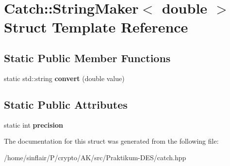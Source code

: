 \hypertarget{structCatch_1_1StringMaker_3_01double_01_4}{}\section{Catch\+:\+:String\+Maker$<$ double $>$ Struct Template Reference}
\label{structCatch_1_1StringMaker_3_01double_01_4}
\subsection*{Static Public Member Functions}
\begin{DoxyCompactItemize}
\item 
\mbox{\label{structCatch_1_1StringMaker_3_01double_01_4_acaa61529acad2462292c747d34e5f3d2}} 
static std\+::string {\bfseries convert} (double value)
\end{DoxyCompactItemize}
\subsection*{Static Public Attributes}
\begin{DoxyCompactItemize}
\item 
\mbox{\label{structCatch_1_1StringMaker_3_01double_01_4_a15fa2b093c532ece7f1d0c713ebaee67}} 
static int {\bfseries precision}
\end{DoxyCompactItemize}


The documentation for this struct was generated from the following file\+:\begin{DoxyCompactItemize}
\item 
/home/sinflair/\+P/crypto/\+A\+K/src/\+Praktikum-\/\+D\+E\+S/catch.\+hpp\end{DoxyCompactItemize}
